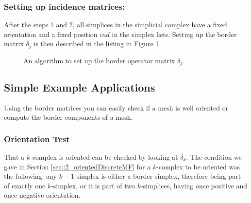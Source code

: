 \subsubsection{Setting up incidence matrices:}
After the steps 1 and 2, all simplices in the simplicial complex have a fixed orientation and a fixed position $ind$ in the simplex lists. Setting up the border matrix $\delta_j$ is then described in the listing in Figure \ref{alg:deltaj} 

\begin{figure}

\begin{center}
\end{center}
\caption{An algorithm to set up the border operator matrix $\delta_j$.}
\label{alg:deltaj}
\end{figure}
		
\subsection{Simple Example Applications}
Using the border matrices you can easily check if a mesh is well oriented or compute the border components of a mesh.

	
\subsubsection{Orientation Test}
That a $k$-complex is oriented can be checked by looking at $\delta_k$. The condition we gave in Section \ref{sec::2_orientedDiscreteMF} for a $k$-complex to be oriented was the following: any $k-1$ simplex is either a border simplex, therefore being part of exactly one $k$-simplex, or it is part of two $k$-simplices, having once positive and once negative orientation. 

